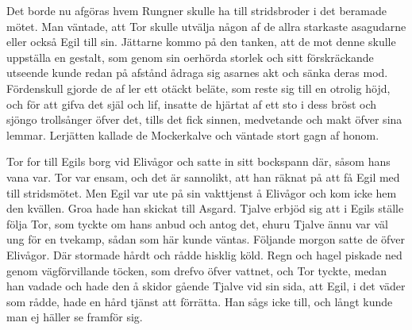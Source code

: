 Det borde nu afgöras hvem Rungner skulle ha till stridsbroder i det
beramade mötet. Man väntade, att Tor skulle utvälja någon af de allra
starkaste asagudarne eller också Egil till sin. Jättarne kommo på den
tanken, att de mot denne skulle uppställa en gestalt, som genom sin
oerhörda storlek och sitt förskräckande utseende kunde redan på
afstånd\protect\hypertarget{lb1625905.xhtmlux5cux23start65}{}{}\protect\hypertarget{lb1625905.xhtmlux5cux23start65-a}{}{}\protect\hypertarget{lb1625905.xhtmlux5cux23start65-b}{}{}\protect\hypertarget{lb1625905.xhtmlux5cux23start65-c}{}{}\protect\hypertarget{lb1625905.xhtmlux5cux23start65-d}{}{}
ådraga sig asarnes akt och sänka deras mod. Fördenskull gjorde de af ler
ett otäckt beläte, som reste sig till en otrolig höjd, och för att gifva
det själ och lif, insatte de hjärtat af ett sto i dess bröst och sjöngo
trollsånger öfver det, tills det fick sinnen, medvetande och makt öfver
sina lemmar. Lerjätten kallade de Mockerkalve och väntade stort gagn af
honom.

Tor for till Egils borg vid Elivågor och satte in sitt bockspann där,
såsom hans vana var. Tor var ensam, och det är sannolikt, att han räknat
på att få Egil med till stridsmötet. Men Egil var ute på sin vakttjenst
å Elivågor och kom icke hem den kvällen. Groa hade han skickat till
Asgard. Tjalve erbjöd sig att i Egils ställe följa Tor, som tyckte om
hans anbud och antog det, ehuru Tjalve ännu var väl ung för en tvekamp,
sådan som här kunde väntas. Följande morgon satte de öfver Elivågor. Där
stormade hårdt och rådde hisklig köld. Regn och hagel piskade ned genom
vägförvillande töcken, som drefvo öfver vattnet, och Tor tyckte, medan
han vadade och hade den å skidor gående Tjalve vid sin sida, att Egil, i
det väder som rådde, hade en hård tjänst att förrätta. Han sågs icke
till, och långt kunde man ej häller se framför sig.

